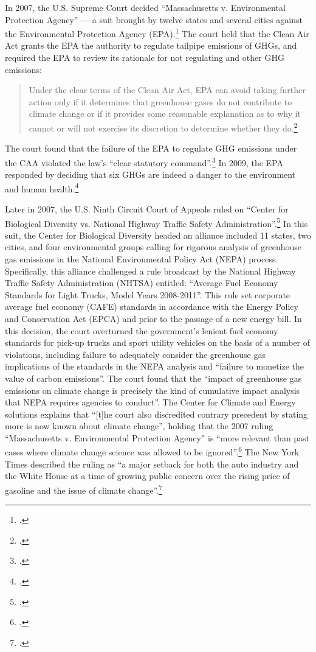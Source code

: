 In 2007, the U.S. Supreme Court decided ``Massachusetts v. Environmental Protection Agency'' --- a suit brought by twelve states and several cities against the Environmental Protection Agency (EPA).\footcite[][]{MassVEPA}
The court held that the Clean Air Act grants the EPA the authority to regulate tailpipe emissions of GHGs, and required the EPA to review its rationale for not regulating  and other GHG emissions:
\begin{quote}
Under the clear terms of the Clean Air Act, EPA can avoid taking further action only if it determines that greenhouse gases do not contribute to climate change or if it provides some reasonable explanation as to why it cannot or will not exercise its discretion to determine whether they do.\footcite[][p. 30]{MassVEPA}
\end{quote}
The court found that the failure of the EPA to regulate GHG emissions under the CAA violated the law's ``clear statutory command''.\footcite[See: ][]{EPAhaspower}
In 2009, the EPA responded by deciding that six GHGs are indeed a danger to the environment and human health.\footcite[][]{GreenFigleaf}



Later in 2007, the U.S. Ninth Circuit Court of Appeals ruled on ``Center for Biological Diversity vs. National Highway Traffic Safety Administration''.\footcite[][]{9thcircuitHighway}
In this suit, the Center for Biological Diversity headed an alliance included 11 states, two cities, and four environmental groups calling for rigorous analysis of greenhouse gas emissions in the National Environmental Policy Act (NEPA) process. 
Specifically, this alliance challenged a rule broadcast by the National Highway Traffic Safety Administration (NHTSA) entitled: ``Average Fuel Economy Standards for Light Trucks, Model Years 2008-2011''.
This rule set corporate average fuel economy (CAFE) standards in accordance with the Energy Policy and Conservation Act (EPCA) and prior to the passage of a new energy bill.  
In this decision, the court overturned the government's lenient fuel economy standards for pick-up trucks and sport utility vehicles on the basis of a number of violations, including failure to adequately consider the greenhouse gas implications of the standards in the NEPA analysis and ``failure to monetize the value of carbon emissions''.
The court found that the ``impact of greenhouse gas emissions on climate change is precisely the kind of cumulative impact analysis that NEPA requires agencies to conduct''.
The Center for Climate and Energy solutions explains that ``[t]he court also discredited contrary precedent by stating more is now known about climate change'', holding that the 2007 ruling ``Massachusetts v. Environmental Protection Agency'' is ``more relevant than past cases where climate change science was allowed to be ignored''.\footcite[][]{NEPACases}
The New York Times described the ruling as ``a major setback for both the auto industry and the White House at a time of growing public concern over the rising price of gasoline and the issue of climate change''.\footcite[][]{CourtRejectsTruckStandards}



